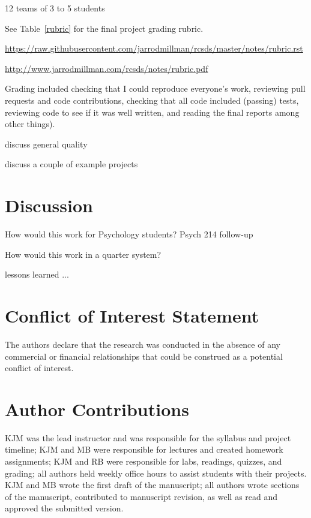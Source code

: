 12 teams of 3 to 5 students

See Table~\ref{rubric} for the final project grading rubric.

\url{https://raw.githubusercontent.com/jarrodmillman/rcsds/master/notes/rubric.rst}

\url{http://www.jarrodmillman.com/rcsds/notes/rubric.pdf}

Grading included checking that I could reproduce everyone's work, reviewing pull
requests and code contributions, checking that all code included
(passing) tests, reviewing code to see if it was well written, and
reading the final reports among other things). 

discuss general quality

discuss a couple of example projects
\citep{tom2007neural}

\section{Discussion}

How would this work for Psychology students?  Psych 214 follow-up

How would this work in a quarter system?

lessons learned ...


\section*{Conflict of Interest Statement}

The authors declare that the research was conducted in the absence of any commercial or financial relationships that could be construed as a potential conflict of interest.

\section*{Author Contributions}

KJM was the lead instructor and was responsible for the syllabus and project timeline;
KJM and MB were responsible for lectures and created homework assignments;
KJM and RB were responsible for labs, readings, quizzes, and grading;
all authors held weekly office hours to assist students with their projects.
KJM and MB wrote the first draft of the manuscript;
all authors wrote sections of the manuscript, contributed to manuscript revision, 
as well as read and approved the submitted version.

